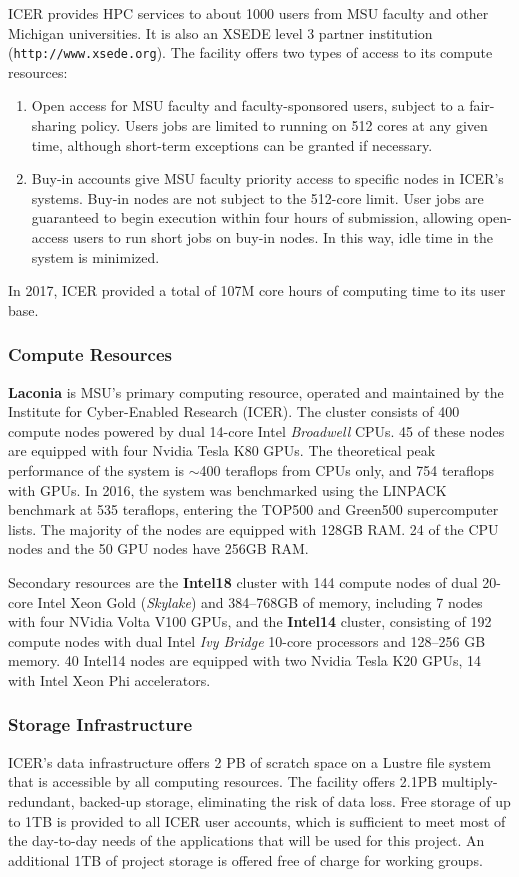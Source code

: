 \documentclass[11pt]{article}
\begin{document}
ICER provides HPC services to about 1000 users from MSU faculty and other
Michigan universities. It is also an XSEDE level 3 partner institution
(\texttt{http://www.xsede.org}). The facility offers two types of access
to its compute resources:
\begin{enumerate}
\item Open access for MSU faculty and faculty-sponsored users, subject to
a fair-sharing policy. Users jobs are limited to running on 512 cores at
any given time, although short-term exceptions can be granted if necessary.
\item Buy-in accounts give MSU faculty priority access to specific nodes
in ICER's systems. Buy-in nodes are not subject to the 512-core limit.
User jobs are guaranteed to begin execution within four hours of submission,
allowing open-access users to run short jobs on buy-in nodes. In this way,
idle time in the system is minimized.
\end{enumerate}
In 2017, ICER provided a total of 107M core hours of computing time to its
user base.

\subsubsection{Compute Resources}
\textbf{Laconia} is MSU's primary computing resource, operated and maintained
by the Institute for Cyber-Enabled Research (ICER). The cluster consists
of 400 compute nodes powered by dual 14-core Intel \emph{Broadwell} CPUs.
45 of these nodes are equipped with four Nvidia Tesla K80 GPUs. The theoretical
peak performance of the system is  $\sim$400 teraflops from CPUs only, and
754 teraflops with GPUs. In 2016, the system was benchmarked using the LINPACK benchmark at 535 teraflops, entering the TOP500 and Green500 supercomputer lists. The majority of the nodes are equipped with 128GB
RAM. 24 of the CPU nodes and the 50 GPU nodes have 256GB RAM.

Secondary resources are the \textbf{Intel18} cluster with 144 compute nodes of dual 20-core Intel Xeon Gold (\emph{Skylake}) and 384--768GB of memory, including 7 nodes with four NVidia Volta V100 GPUs, and the \textbf{Intel14} cluster, consisting of 192 compute nodes
with dual Intel \emph{Ivy Bridge} 10-core processors and 128--256 GB memory. 40 Intel14 nodes are equipped with two Nvidia Tesla K20
GPUs, 14 with Intel Xeon Phi accelerators. 

\subsubsection{Storage Infrastructure}
ICER's data infrastructure offers 2 PB of scratch space on a Lustre
file system that is accessible by all computing resources. The facility offers 2.1PB multiply-redundant, backed-up storage, eliminating the risk of data loss.
Free storage of up to 1TB is provided to all ICER user accounts, which is
sufficient to meet most of the day-to-day needs of the applications that
will be used for this project. An additional 1TB of project storage
is offered free of charge for working groups.
\end{document}
